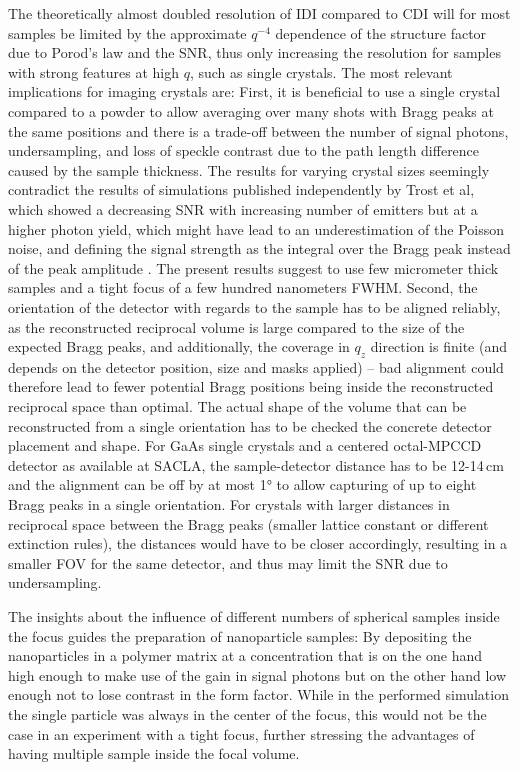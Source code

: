 The theoretically almost doubled resolution of IDI compared to CDI will for most samples be limited by the approximate $q^{-4}$ dependence of the structure factor due to Porod's law and the SNR, thus only increasing the resolution for samples with strong features at high $q$, such as single crystals.
The most relevant implications for imaging crystals are: First, it is beneficial to use a single crystal compared to a powder to allow averaging over many shots with Bragg peaks at the same positions and there is a trade-off between the number of signal photons, undersampling, and loss of speckle contrast due to the path length difference caused by the sample thickness. The results for varying crystal sizes seemingly contradict the results of simulations published independently by Trost et al, which showed a decreasing SNR with increasing number of emitters but at a higher photon yield, which might have lead to an underestimation of the Poisson noise, and defining the signal strength as the integral over the Bragg peak instead of the peak amplitude \cite{trost2020}. The present results suggest to use few micrometer thick samples and a tight focus of a few hundred nanometers FWHM. Second, the orientation of the detector with regards to the sample has to be aligned reliably, as the reconstructed reciprocal volume is large compared to the size of the expected Bragg peaks, and additionally, the coverage in $q_z$ direction is finite (and depends on the detector position, size and masks applied) -- bad alignment could therefore lead to fewer potential Bragg positions being inside the reconstructed reciprocal space than optimal. The actual shape of the volume that can be reconstructed from a single orientation has to be checked the concrete detector placement and shape.  For GaAs single crystals and a centered octal-MPCCD detector as available at SACLA, the sample-detector distance has to be 12-14\,cm and the alignment can be off by at most 1° to allow capturing of up to eight Bragg peaks in a single orientation. For crystals with larger distances in reciprocal space between the Bragg peaks (smaller lattice constant or different extinction rules), the distances would have to be closer accordingly, resulting in a smaller FOV for the same detector, and thus may limit the SNR due to undersampling.

The insights about the influence of different numbers of spherical samples inside the focus guides the preparation of nanoparticle samples: By depositing the nanoparticles in a polymer matrix at a concentration that is on the one hand high enough to make use of the gain in signal photons but on the other hand low enough not to lose contrast in the form factor. While in the performed simulation the single particle was always in the center of the focus, this would not be the case in an experiment with a tight focus, further stressing the advantages of having multiple sample inside the focal volume.

